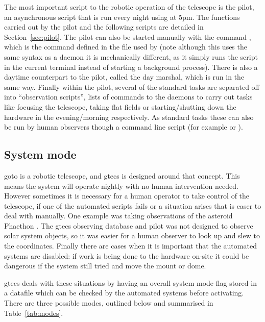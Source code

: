 \begin{colsection}
\begin{colsection}
The most important script to the robotic operation of the telescope is the pilot, an asynchronous script that is run every night using  at 5pm. The functions carried out by the pilot and the following scripts are detailed in Section~\ref{sec:pilot}. The pilot can also be started manually with the command , which is the command defined in the  file used by  (note although this uses the same syntax as a daemon it is mechanically different, as it simply runs the script in the current terminal instead of starting a background process). There is also a daytime counterpart to the pilot, called the day marshal, which is run in the same way. Finally within the pilot, several of the standard tasks are separated off into ``observation scripts'', lists of commands to the daemons to carry out tasks like focusing the telescope, taking flat fields or starting/shutting down the hardware in the evening/morning respectively. As standard tasks these can also be run by human observers though a command line script  (for example  or ).

\end{colsection}


\subsection{System mode}
\label{sec:mode}
\begin{colsection}

\gls{goto} is a robotic telescope, and \gls{gtecs} is designed around that concept. This means the system will operate nightly with no human intervention needed. However sometimes it is necessary for a human operator to take control of the telescope, if one of the automated scripts fails or a situation arises that is easer to deal with manually. One example was taking observations of the asteroid Phaethon \citep{Phaethon}. The \gls{gtecs} observing database and pilot was not designed to observe solar system objects, so it was easier for a human observer to look up and slew to the coordinates. Finally there are cases when it is important that the automated systems are disabled: if work is being done to the hardware on-site it could be dangerous if the system still tried and move the mount or dome.

\gls{gtecs} deals with these situations by having an overall system mode flag stored in a datafile which can be checked by the automated systems before activating. There are three possible modes, outlined below and summarised in Table~\ref{tab:modes}.


\end{colsection}
\end{colsection}
